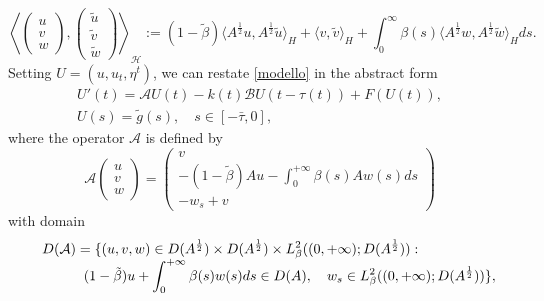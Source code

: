 \documentclass[11pt]{article}
\begin{document}
\begin{equation}\label{inner}
\left\langle
\left (
\begin{array}{l}
u\\
v\\
w
\end{array}
\right ),
\left (
\begin{array}{l}
\tilde u\\
\tilde v\\
\tilde w
\end{array}
\right )
\right\rangle_{\mathcal{H}}:= (1-\tilde\beta ) \langle A^{\frac 12}u, A^{\frac 12} \tilde u\rangle_H+\langle v, \tilde v\rangle_H+\int_0^\infty \beta (s)\langle  A^{\frac 12}w,  A^{\frac 12} \tilde w\rangle_H ds.
\end{equation}
Setting $U= (u, u_t, \eta^t)$, we can restate \eqref{modello} in the abstract form
\begin{equation}
\label{forma_astratta2}
\begin{array}{l}
\displaystyle{ U'(t)= \mathcal{A} U(t)-k(t)\mathcal{B}U(t-\tau(t))+F(U(t)),}\\
\displaystyle{ U(s)=\tilde g(s), \quad s\in [-\bar\tau, 0],}
\end{array}
\end{equation}
where the operator ${\mathcal A}$  is defined by
\begin{equation*}
\mathcal{A} \begin{pmatrix}
u\\
v\\
w
\end{pmatrix}
=
\begin{pmatrix}
v\\
-(1-\tilde{\beta})Au-\int_0^{+\infty} \beta(s) A w(s) ds \\
-w_s +v
\end{pmatrix}
\end{equation*}
with domain
\begin{equation}
\begin{array}{c}
\displaystyle{ {D}(\mathcal{A})= \{ (u,v,w) \in D(A^{\frac 12})\times D(A^{\frac 12})\times L_{\beta}^2 ((0,+\infty); D(A^{\frac 12})):}\hspace{1,5 cm}\\
\hspace{1.5 cm}
\displaystyle{(1-\tilde{\beta})u+\int_0^{+\infty} \beta (s) w(s)ds \in D(A), \quad w_s \in L^2_{\beta} ((0,+\infty); D(A^{\frac 12}))\},}
\end{array}
\end{equation}
\end{document}
